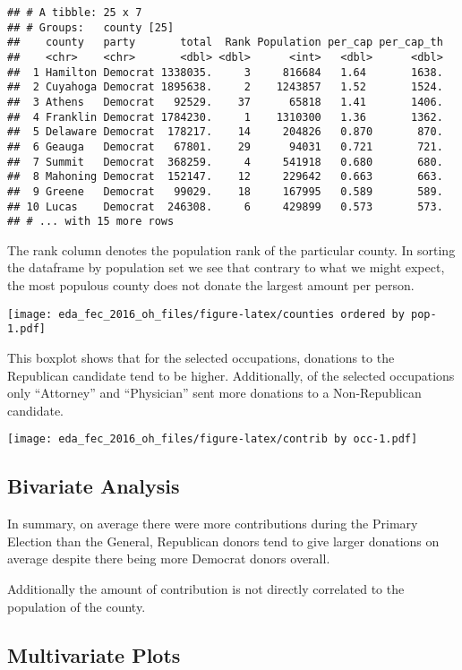 \documentclass[]{article}
\begin{document}
\begin{verbatim}
## # A tibble: 25 x 7
## # Groups:   county [25]
##    county   party       total  Rank Population per_cap per_cap_th
##    <chr>    <chr>       <dbl> <dbl>      <int>   <dbl>      <dbl>
##  1 Hamilton Democrat 1338035.     3     816684   1.64       1638.
##  2 Cuyahoga Democrat 1895638.     2    1243857   1.52       1524.
##  3 Athens   Democrat   92529.    37      65818   1.41       1406.
##  4 Franklin Democrat 1784230.     1    1310300   1.36       1362.
##  5 Delaware Democrat  178217.    14     204826   0.870       870.
##  6 Geauga   Democrat   67801.    29      94031   0.721       721.
##  7 Summit   Democrat  368259.     4     541918   0.680       680.
##  8 Mahoning Democrat  152147.    12     229642   0.663       663.
##  9 Greene   Democrat   99029.    18     167995   0.589       589.
## 10 Lucas    Democrat  246308.     6     429899   0.573       573.
## # ... with 15 more rows
\end{verbatim}

The rank column denotes the population rank of the particular county. In
sorting the dataframe by population set we see that contrary to what we
might expect, the most populous county does not donate the largest
amount per person.

\texttt{[image: eda\_fec\_2016\_oh\_files/figure-latex/counties ordered by pop-1.pdf]}

This boxplot shows that for the selected occupations, donations to the
Republican candidate tend to be higher. Additionally, of the selected
occupations only ``Attorney'' and ``Physician'' sent more donations to a
Non-Republican candidate.

\texttt{[image: eda\_fec\_2016\_oh\_files/figure-latex/contrib by occ-1.pdf]}

\hypertarget{bivariate-analysis}{%
\subsection{Bivariate Analysis}\label{bivariate-analysis}}

In summary, on average there were more contributions during the Primary
Election than the General, Republican donors tend to give larger
donations on average despite there being more Democrat donors overall.

Additionally the amount of contribution is not directly correlated to
the population of the county.

\hypertarget{multivariate-plots}{%
\subsection{Multivariate Plots}\label{multivariate-plots}}
\end{document}
